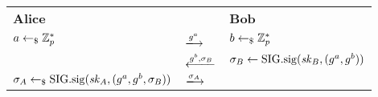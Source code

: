 \begin{tabular}{lC{3cm}l}
    \textbf{Alice} &  & \textbf{Bob}\\
    $a\gets_\$\mathbb{Z}_p^*$ & $\xlongrightarrow{g^a}$ & $b\gets_\$\mathbb{Z}_p^*$ \\
     & $\xlongleftarrow{g^b,\sigma_B}$ & $\sigma_B\gets\mathrm{SIG}.\mathrm{sig}(\mathit{sk}_B,(g^a, g^b))$ \\
     $\sigma_A\gets_\$\mathrm{SIG}.\mathrm{sig}(\mathit{sk}_A,(g^a, g^b, \sigma_B))$ & $\xlongrightarrow{\sigma_A}$ & \\
\end{tabular}